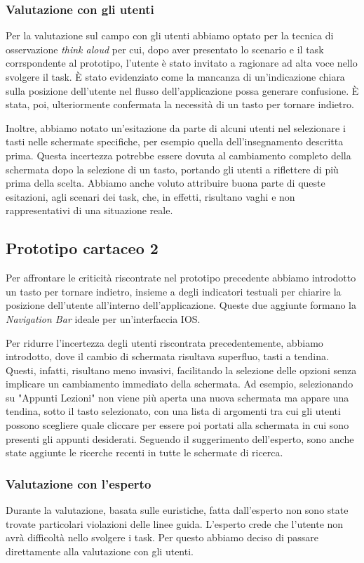 \subsubsection{Valutazione con gli utenti}
Per la valutazione sul campo con gli utenti abbiamo optato per la tecnica di osservazione \textit{think aloud} per cui, dopo aver presentato lo scenario
e il task corrspondente al prototipo, l'utente è stato invitato a ragionare ad alta voce nello svolgere il task. È stato evidenziato come la mancanza
di un'indicazione chiara sulla posizione dell'utente nel flusso dell'applicazione possa generare confusione. È stata, poi, ulteriormente confermata la necessità di
un tasto per tornare indietro.

Inoltre, abbiamo notato un'esitazione da parte di alcuni utenti nel selezionare i tasti nelle schermate specifiche, per esempio quella dell'insegnamento descritta
prima. Questa incertezza potrebbe essere dovuta al cambiamento completo della schermata dopo la selezione di un tasto, portando gli utenti a riflettere di più prima della scelta.
Abbiamo anche voluto attribuire buona parte di queste esitazioni, agli scenari dei task, che, in effetti, risultano vaghi e non rappresentativi di una situazione reale.


\subsection{Prototipo cartaceo 2}
Per affrontare le criticità riscontrate nel prototipo precedente abbiamo introdotto un tasto per tornare indietro, insieme a degli indicatori testuali per chiarire
la posizione dell'utente all'interno dell'applicazione. Queste due aggiunte formano la \textit{Navigation Bar} ideale per un'interfaccia IOS.

Per ridurre l'incertezza degli utenti riscontrata precedentemente, abbiamo introdotto, dove il cambio di schermata risultava superfluo, tasti a tendina. Questi,
infatti, risultano meno invasivi, facilitando la selezione delle opzioni senza implicare un cambiamento immediato della schermata. Ad esempio, selezionando su
"Appunti Lezioni" non viene più aperta una nuova schermata ma appare una tendina, sotto il tasto selezionato, con una lista di argomenti tra cui gli utenti possono
scegliere quale cliccare per essere poi portati alla schermata in cui sono presenti gli appunti desiderati.
Seguendo il suggerimento dell'esperto, sono anche state aggiunte le ricerche recenti in tutte le schermate di ricerca.


\subsubsection{Valutazione con l'esperto}
Durante la valutazione, basata sulle euristiche, fatta dall’esperto non sono state trovate particolari violazioni delle linee guida. L’esperto crede che l’utente non avrà difficoltà nello svolgere i task.
Per questo abbiamo deciso di passare direttamente alla valutazione con gli utenti.


